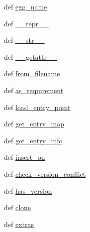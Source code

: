 \begin{DoxyCompactItemize}
def \hyperlink{classpkg__resources_1_1Distribution_aa40f30a530cda87542e142e62a591445}{egg\+\_\+name}
\item 
def \hyperlink{classpkg__resources_1_1Distribution_a697705d58690ac4378eb32591a3fb4ec}{\+\_\+\+\_\+repr\+\_\+\+\_\+}
\item 
def \hyperlink{classpkg__resources_1_1Distribution_afb6937a598a357f7cf0341e1474702cd}{\+\_\+\+\_\+str\+\_\+\+\_\+}
\item 
def \hyperlink{classpkg__resources_1_1Distribution_a63e02bbeeecfc8e75b0d70d7e34ce125}{\+\_\+\+\_\+getattr\+\_\+\+\_\+}
\item 
def \hyperlink{classpkg__resources_1_1Distribution_a1cded24f024d80b2c3470b55e03ab0a0}{from\+\_\+filename}
\item 
def \hyperlink{classpkg__resources_1_1Distribution_a81e78219f66a92b80bd02beb9321914d}{as\+\_\+requirement}
\item 
def \hyperlink{classpkg__resources_1_1Distribution_a50f39c100541b07dd6c613e4f3609282}{load\+\_\+entry\+\_\+point}
\item 
def \hyperlink{classpkg__resources_1_1Distribution_acb09b6bda6f7934e333cc8f9b375dd61}{get\+\_\+entry\+\_\+map}
\item 
def \hyperlink{classpkg__resources_1_1Distribution_afa79d16a191e6b747a37c01ac2a3e8df}{get\+\_\+entry\+\_\+info}
\item 
def \hyperlink{classpkg__resources_1_1Distribution_a134745eb4ffb40d24f86df37985838dc}{insert\+\_\+on}
\item 
def \hyperlink{classpkg__resources_1_1Distribution_a355f2d6bb31f03d08ed6281c1e3a97b2}{check\+\_\+version\+\_\+conflict}
\item 
def \hyperlink{classpkg__resources_1_1Distribution_a9c7c8b87a8512f678bc25d139cb53ef3}{has\+\_\+version}
\item 
def \hyperlink{classpkg__resources_1_1Distribution_af1a15c8284cce4974637a78a9846655f}{clone}
\item 
def \hyperlink{classpkg__resources_1_1Distribution_aa6cf8d12c8395495fd2af8ab3eb66718}{extras}
\end{DoxyCompactItemize}
